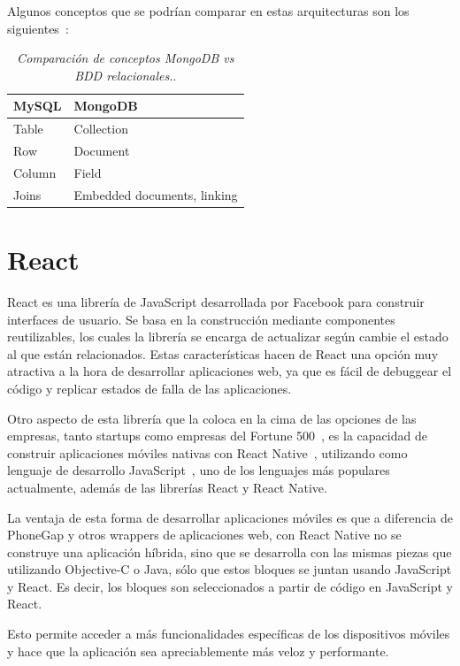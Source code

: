 Algunos conceptos que se podrían comparar en estas arquitecturas son los siguientes~\cite{MongoDBDocs}:

\begin{table}[H]
    \centering
    \begin{tabular}{ | l | l |}
    \hline
	MySQL & MongoDB \\ \hline
	Table & Collection \\ \hline
	Row & Document \\ \hline
	Column & Field \\ \hline
	Joins & Embedded documents, linking \\ \hline
    \end{tabular}
    \caption{\textit{Comparación de conceptos MongoDB vs BDD relacionales.}.}
    \label{tab:mongo-compare}
\end{table}

\section{React} \label{react-section}
React es una librería de JavaScript desarrollada por Facebook para construir interfaces de usuario. Se basa en la construcción mediante componentes reutilizables, los cuales la librería se encarga de actualizar según cambie el estado al que están relacionados. Estas características hacen de React una opción muy atractiva a la hora de desarrollar aplicaciones web, ya que es fácil de debuggear el código y replicar estados de falla de las aplicaciones.

Otro aspecto de esta librería que la coloca en la cima de las opciones de las empresas, tanto startups como empresas del Fortune 500~\cite{reactjs}, es la capacidad de construir aplicaciones móviles nativas con React Native~\cite{reactnative}, utilizando como lenguaje de desarrollo JavaScript~\cite{js}, uno de los lenguajes más populares actualmente, además de las librerías React y React Native.

La ventaja de esta forma de desarrollar aplicaciones móviles es que a diferencia de PhoneGap y otros wrappers de aplicaciones web, con React Native no se construye una aplicación híbrida, sino que se desarrolla con las mismas piezas que utilizando Objective-C o Java, sólo que estos bloques se juntan usando JavaScript y React. Es decir, los bloques son seleccionados a partir de código en JavaScript y React.

Esto permite acceder a más funcionalidades específicas de los dispositivos móviles y hace que la aplicación sea apreciablemente más veloz y performante.

